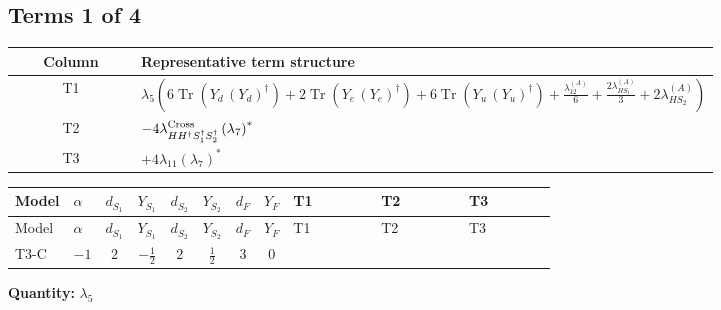 \documentclass[8pt]{article}
\begin{document}
\begin{landscape}
\subsection*{Terms 1 of 4}
\begin{center}
\begin{tabular}{@{}c >{\raggedright\arraybackslash}p{0.82\linewidth}@{}}
\toprule
Column & Representative term structure \\
\midrule
T1 & \(\displaystyle {\lambda_5} \left(6 \operatorname{Tr}\!\left({Y_d}\,\left({Y_d}\right)^{\dagger}\right)+2 \operatorname{Tr}\!\left({Y_e}\,\left({Y_e}\right)^{\dagger}\right)+6 \operatorname{Tr}\!\left({Y_u}\,\left({Y_u}\right)^{\dagger}\right)+\frac{{\lambda_{12}^{(A)}}}{6}+\frac{2 {\lambda_{HS_1}^{(A)}}}{3}+2 {\lambda_{HS_2}^{(A)}}\right)\) \\
\midrule
T2 & \(\displaystyle -4 {\lambda_{H H^\dagger S_1^\dagger S_2^\dagger}^{\rm Cross}} \left({\lambda_{7}}\right)^{*}\) \\
\midrule
T3 & \(\displaystyle +4 {\lambda_{11}} \left({\lambda_{7}}\right)^{*}\) \\
\midrule
\bottomrule
\end{tabular}
\end{center}
\smallskip
\tiny
\begin{longtable}{@{}llcccccc >{\raggedright\arraybackslash}p{0.21\linewidth} >{\raggedright\arraybackslash}p{0.21\linewidth} >{\raggedright\arraybackslash}p{0.21\linewidth}@{}}
\toprule
Model & $\alpha$ & $d_{S_1}$ & $Y_{S_1}$ & $d_{S_2}$ & $Y_{S_2}$ & $d_F$ & $Y_F$ & T1 & T2 & T3 \\
\midrule
\endfirsthead
\toprule
Model & $\alpha$ & $d_{S_1}$ & $Y_{S_1}$ & $d_{S_2}$ & $Y_{S_2}$ & $d_F$ & $Y_F$ & T1 & T2 & T3 \\
\midrule
\endhead
T3-C & $-1$ & $2$ & $-\frac{1}{2}$ & $2$ & $\frac{1}{2}$ & $3$ & $0$ & \scriptsize\adjustbox{max width=\linewidth}{$\begin{gathered} {\lambda_5} \left(6 \operatorname{Tr}\!\left({Y_d}\,\left({Y_d}\right)^{\dagger}\right)+2 \operatorname{Tr}\!\left({Y_e}\,\left({Y_e}\right)^{\dagger}\right)+6 \operatorname{Tr}\!\left({Y_u}\,\left({Y_u}\right)^{\dagger}\right)+\frac{{\lambda_{12}^{(A)}}}{6}+\frac{2 {\lambda_{HS_1}^{(A)}}}{3}+2 {\lambda_{HS_2}^{(A)}}\right)\end{gathered}$} & \scriptsize\adjustbox{max width=\linewidth}{$\begin{gathered} -4 {\lambda_{H H^\dagger S_1^\dagger S_2^\dagger}^{\rm Cross}} \left({\lambda_{7}}\right)^{*}\end{gathered}$} & \scriptsize\adjustbox{max width=\linewidth}{$\begin{gathered} +4 {\lambda_{11}} \left({\lambda_{7}}\right)^{*}\end{gathered}$} \\
\midrule
\bottomrule
\end{longtable}
\clearpage
\noindent\textbf{Quantity: }$\lambda_5$\par\smallskip

\end{landscape}
\end{document}

